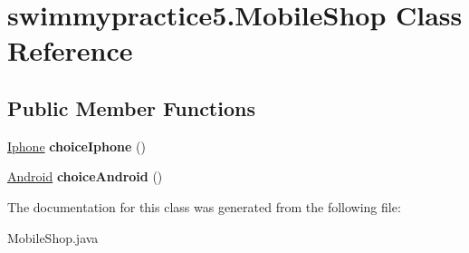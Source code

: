 \hypertarget{classswimmypractice5_1_1_mobile_shop}{}\section{swimmypractice5.\+Mobile\+Shop Class Reference}
\label{classswimmypractice5_1_1_mobile_shop}
\subsection*{Public Member Functions}
\begin{DoxyCompactItemize}
\item 
\mbox{\label{classswimmypractice5_1_1_mobile_shop_ac1e379aee7909f1fbfbd9e2b82a033d5}} 
\hyperlink{classswimmypractice5_1_1_iphone}{Iphone} {\bfseries choice\+Iphone} ()
\item 
\mbox{\label{classswimmypractice5_1_1_mobile_shop_acb06ee43812e6046754c5628ba74c01e}} 
\hyperlink{classswimmypractice5_1_1_android}{Android} {\bfseries choice\+Android} ()
\end{DoxyCompactItemize}


The documentation for this class was generated from the following file\+:\begin{DoxyCompactItemize}
\item 
Mobile\+Shop.\+java\end{DoxyCompactItemize}
